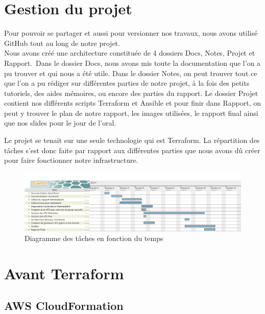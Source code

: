 \documentclass[]{article}
\begin{document}
\newpage
\section{Gestion du projet}\label{ruxe9partition-des-tuxe2ches-au-seins-du-groupe}

Pour pouvoir se partager et aussi pour versionner nos travaux, nous avons utilisé GitHub tout au long de notre projet. \\
Nous avons créé une architecture constituée de 4 dossiers Docs, Notes, Projet et Rapport.\
Dans le dossier Docs, nous avons mis toute la documentation que l'on a pu trouver et qui nous a été utile. Dans le dossier Notes, on peut trouver tout ce que l'on a pu rédiger sur différentes parties de notre projet, à la fois des petits tutoriels, des aides mémoires, ou encore des parties du rapport. Le dossier Projet contient nos différents scripts Terraform et Ansible et pour finir dans Rapport, on peut y trouver le plan de notre rapport, les images utilisées, le rapport final ainsi que nos slides pour le jour de l'oral.

Le projet se tenait sur une seule technologie qui est Terraform. La
répartition des tâches s'est donc faite par rapport aux différentes
parties que nous avons dû créer pour faire fonctionner notre
infrastructure.

\begin{figure}
\centering
\includegraphics{Images/TerraFormGant.png}
\caption{Diagramme des tâches en fonction du temps}
\end{figure}

\newpage
\section{Avant Terraform}\label{avant-terraform}

\subsection{AWS CloudFormation}\label{aws-cloudformation}
\end{document}
